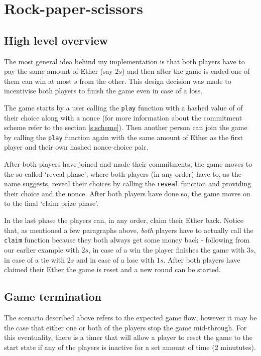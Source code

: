 \documentclass{article}
\begin{document}
    \section{Rock-paper-scissors}

    \subsection{High level overview} \label{s:overview}
    The most general idea behind my implementation is that
    both players have to pay the same amount of Ether (say
    \(2s\)) and then after the game is ended one of them can
    win at most \(s\) from the other. This design decision
    was made to incentivise both players to finish the game
    even in case of a loss.
    \newline

    \noindent The game starts by a user calling the
    \verb|play| function with a hashed value of of their
    choice along with a nonce (for more information about
    the commitment scheme refer to the section
    \ref{s:scheme}). Then another person can join the game
    by calling the \verb|play| function again with the same
    amount of Ether as the first player and their own hashed
    nonce-choice pair.
    \newline

    \noindent After both players have joined and made their
    commitments, the game moves to the so-called `reveal
    phase', where both players (in any order) have to, as
    the name suggests, reveal their choices by calling the
    \verb|reveal| function and providing their choice and
    the nonce. After both players have done so, the game
    moves on to the final `claim prize phase'.
    \newline

    \noindent In the last phase the players can, in any
    order, claim their Ether back. Notice that, as mentioned
    a few paragraphs above, {\itshape both} players have to
    actually call the \verb|claim| function because they
    both always get some money back - following from our
    earlier example with \(2s\), in case of a win the player
    finishes the game with \(3s\), in case of a tie with
    \(2s\) and in case of a lose with \(1s\). After both
    players have claimed their Ether the game is reset and a
    new round can be started.

    \subsection{Game termination}
    The scenario described above refers to the expected game
    flow, however it may be the case that either one or both
    of the players stop the game mid-through. For this
    eventuality, there is a timer that will allow a player
    to reset the game to the start state if any of the
    players is inactive for a set amount of time (2
    minututes).
    \newline
\end{document}

